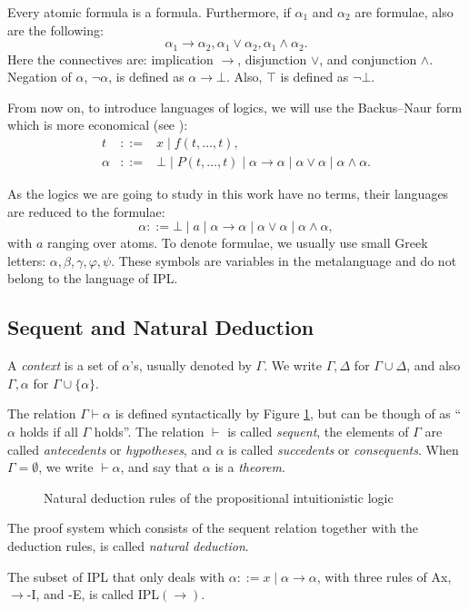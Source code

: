 \begin{definition}[Formula]
Every atomic formula is a formula. Furthermore, if $\alpha_1$ and $\alpha_2$ are formulae, also are the following:
\[
\alpha_1 \rightarrow \alpha_2, \alpha_1 \vee \alpha_2, \alpha_1 \wedge \alpha_2.
\]
Here the connectives are: implication $\rightarrow$, disjunction $\vee$, and conjunction $\wedge$.
Negation of $\alpha$, $\neg\alpha$, is defined as $\alpha \rightarrow \bot$. Also, $\top$ is defined as $\neg\bot$.
\end{definition}

From now on, to introduce languages of logics, we will use the Backus--Naur form which is more economical (see \cite{DBLP:conf/ifip/Backus59}):
\begin{eqnarray*}
t &::=& x \mid f(t, \dots, t), \\
\alpha &::=& \bot \mid P(t, \dots, t) \mid \alpha \rightarrow \alpha \mid \alpha \vee \alpha \mid \alpha \wedge \alpha.
\end{eqnarray*}

As the logics we are going to study in this work have no terms, their languages are reduced to the formulae:
\[
\alpha ::= \bot \mid a \mid \alpha \rightarrow \alpha \mid \alpha \vee \alpha \mid \alpha \wedge \alpha,
\]
with $a$ ranging over atoms. To denote formulae, we usually use small Greek letters: $\alpha, \beta, \gamma, \varphi, \psi$. These symbols are variables in the metalanguage and do not belong to the language of IPL.

\subsection{Sequent and Natural Deduction}

A \textit{context} is a set of $\alpha$'s, usually denoted by $\Gamma$. We write $\Gamma, \Delta$ for $\Gamma \cup \Delta$, and also $\Gamma, \alpha$ for $\Gamma \cup \{\alpha\}$. 

\begin{definition}[Sequent]
The relation $\Gamma \vdash \alpha$ is defined syntactically by Figure \ref{fig:intuitionistic-logic-natural-deduction}, but can be though of as ``$\alpha$ holds if all $\Gamma$ holds''. The relation $\vdash$ is called \textit{sequent}, the elements of $\Gamma$ are called \textit{antecedents} or \textit{hypotheses}, and $\alpha$ is called \textit{succedents} or \textit{consequents}. When $\Gamma = \emptyset$, we write $\vdash \alpha$, and say that $\alpha$ is a \textit{theorem}.
\end{definition}

\begin{figure}
    \centering
    
    \caption{Natural deduction rules of the propositional intuitionistic logic}
    \label{fig:intuitionistic-logic-natural-deduction}
\end{figure}

The proof system which consists of the sequent relation together with the deduction rules, is called \textit{natural deduction}.

The subset of IPL that only deals with $\alpha ::= x \mid \alpha \rightarrow \alpha$, with three rules of Ax, $\rightarrow$-I, and -E, is called IPL$(\rightarrow)$.
